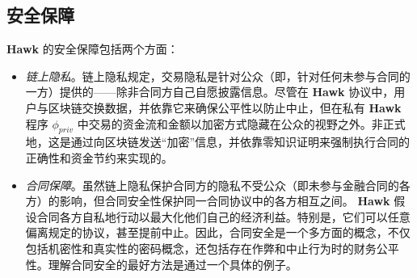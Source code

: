 \documentclass{xduugtrans}
\begin{document}
\subsection{安全保障}

\textbf{Hawk} 的安全保障包括两个方面：

\begin{itemize}
    \item \textit{链上隐私}。链上隐私规定，交易隐私是针对公众（即，针对任何未参与合同的一方）提供的——除非合同方自己自愿披露信息。尽管在 \textbf{Hawk} 协议中，用户与区块链交换数据，并依靠它来确保公平性以防止中止，但在私有 \textbf{Hawk} 程序 $\phi _{priv}$ 中交易的资金流和金额以加密方式隐藏在公众的视野之外。非正式地，这是通过向区块链发送“加密”信息，并依靠零知识证明来强制执行合同的正确性和资金节约来实现的。
    \item \textit{合同保障}。虽然链上隐私保护合同方的隐私不受公众（即未参与金融合同的各方）的影响，但合同安全性保护同一合同协议中的各方相互之间。 \textbf{Hawk} 假设合同各方自私地行动以最大化他们自己的经济利益。特别是，它们可以任意偏离规定的协议，甚至提前中止。因此，合同安全是一个多方面的概念，不仅包括机密性和真实性的密码概念，还包括存在作弊和中止行为时的财务公平性。理解合同安全的最好方法是通过一个具体的例子。
\end{itemize}
\end{document}
